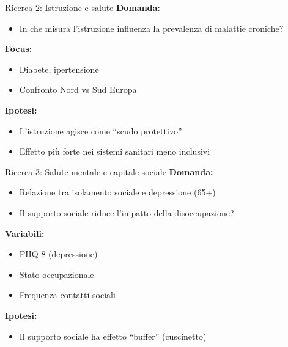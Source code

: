 \documentclass{beamer}
\begin{document}
	\begin{frame}{Ricerca 2: Istruzione e salute}
		\textbf{Domanda:}
		\begin{itemize}
			\item In che misura l'istruzione influenza la prevalenza di malattie croniche?
		\end{itemize}
		
		\vspace{0.3cm}
		\textbf{Focus:}
		\begin{itemize}
			\item Diabete, ipertensione
			\item Confronto Nord vs Sud Europa
		\end{itemize}
		
		\vspace{0.3cm}
		\textbf{Ipotesi:}
		\begin{itemize}
			\item L'istruzione agisce come ``scudo protettivo''
			\item Effetto più forte nei sistemi sanitari meno inclusivi
		\end{itemize}
	\end{frame}
	
	\begin{frame}{Ricerca 3: Salute mentale e capitale sociale}
		\textbf{Domanda:}
		\begin{itemize}
			\item Relazione tra isolamento sociale e depressione (65+)
			\item Il supporto sociale riduce l'impatto della disoccupazione?
		\end{itemize}
		
		\vspace{0.3cm}
		\textbf{Variabili:}
		\begin{itemize}
			\item PHQ-8 (depressione)
			\item Stato occupazionale
			\item Frequenza contatti sociali
		\end{itemize}
		
		\vspace{0.3cm}
		\textbf{Ipotesi:}
		\begin{itemize}
			\item Il supporto sociale ha effetto ``buffer'' (cuscinetto)
		\end{itemize}
	\end{frame}
	
\end{document}
